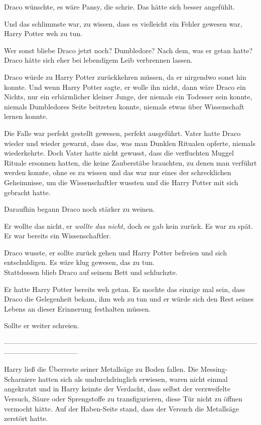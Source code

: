 {Draco wünschte, es wäre Pansy, die schrie. Das hätte sich besser angefühlt.

Und das schlimmste war, zu wissen, dass es vielleicht ein Fehler gewesen war, Harry Potter weh zu tun.

Wer sonst bliebe Draco jetzt noch? Dumbledore? Nach dem, was er getan hatte? Draco hätte sich eher bei lebendigem Leib verbrennen lassen.

Draco würde zu Harry Potter zurückkehren müssen, da er nirgendwo sonst hin konnte. Und wenn Harry Potter sagte, er wolle ihn nicht, dann wäre Draco ein Nichts, nur ein erbärmlicher kleiner Junge, der niemals ein Todesser sein konnte, niemals Dumbledores Seite beitreten konnte, niemals etwas über Wissenschaft lernen konnte.

Die Falle war perfekt gestellt gewesen, perfekt ausgeführt. Vater hatte Draco wieder und wieder gewarnt, dass das, was man Dunklen Ritualen opferte, niemals wiederkehrte. Doch Vater hatte nicht gewusst, dass die verfluchten Muggel Rituale ersonnen hatten, die keine Zauberstäbe brauchten, zu denen man verführt werden konnte, ohne es zu wissen und das war nur eines der schrecklichen Geheimnisse, um die Wissenschaftler wussten und die Harry Potter mit sich gebracht hatte.

Daraufhin begann Draco noch stärker zu weinen.

Er wollte das nicht, er \emph{wollte das nicht,} doch es gab kein zurück. Es war zu spät. Er war bereits ein Wissenschaftler.

Draco wusste, er sollte zurück gehen und Harry Potter befreien und sich entschuldigen. Es wäre klug gewesen, das zu tun.\\ Stattdessen blieb Draco auf seinem Bett und schluchzte.

Er hatte Harry Potter bereits weh getan. Es mochte das einzige mal sein, dass Draco die Gelegenheit bekam, ihm weh zu tun und er würde sich den Rest seines Lebens an dieser Erinnerung festhalten müssen.

Sollte er weiter schreien.

--------------------------------------------------------------------------------------------------------------------------------------------

\hfill\break Harry ließ die Überreste seiner Metallsäge zu Boden fallen. Die Messing-Scharniere hatten sich als undurchdringlich erwiesen, waren nicht einmal angekratzt und in Harry keimte der Verdacht, dass selbst der verzweifelte Versuch, Säure oder Sprengstoffe zu transfigurieren, diese Tür nicht zu öffnen vermocht hätte. Auf der Haben-Seite stand, dass der Versuch die Metallsäge zerstört hatte.

}
